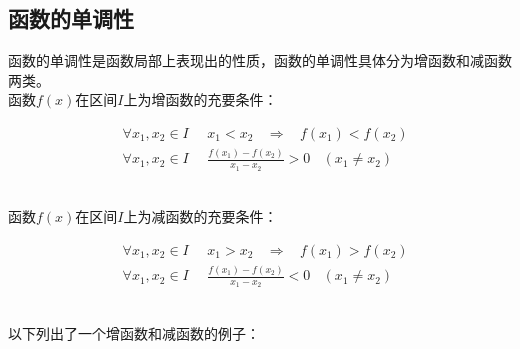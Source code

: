 \documentclass[UTF8]{ctexart}
\begin{document}
\subsection{函数的单调性}
    函数的单调性是函数局部上表现出的性质，函数的单调性具体分为增函数和减函数两类。\\[3mm]
    函数$f(x)$在区间$I$上为增函数的充要条件：\vspace{3pt}
    \begin{large}
        \begin{align*}
            &\forall x_1,x_2\in I~~~~~~x_1<x_2~~~~\Longrightarrow~~~~f(x_1)<f(x_2)\\[4mm]
            &\forall x_1,x_2\in I~~~~~~\frac{f(x_1)-f(x_2)}{x_1-x_2}>0~~~~(x_1\neq x_2)
        \end{align*}
    \end{large}\\
    函数$f(x)$在区间$I$上为减函数的充要条件：\vspace{3pt}
    \begin{large}
        \begin{align*}
            &\forall x_1,x_2\in I~~~~~~x_1>x_2~~~~\Longrightarrow~~~~f(x_1)>f(x_2)\\[4mm]
            &\forall x_1,x_2\in I~~~~~~\frac{f(x_1)-f(x_2)}{x_1-x_2}<0~~~~(x_1\neq x_2)
        \end{align*}
    \end{large}\\
    以下列出了一个增函数和减函数的例子：
\end{document}
